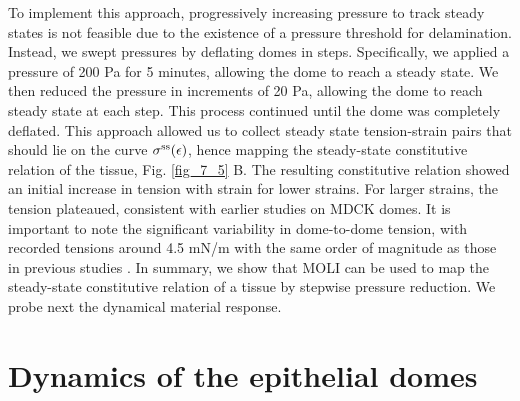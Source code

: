 To implement this approach, progressively increasing pressure to track steady states is not feasible due to the existence of a pressure threshold for delamination. Instead, we swept pressures by deflating domes in steps. Specifically, we applied a pressure of 200 \unit{\pascal} for 5 minutes, allowing the dome to reach a steady state. We then reduced the pressure in increments of 20 \unit{\pascal}, allowing the dome to reach steady state at each step. This process continued until the dome was completely deflated. This approach allowed us to collect steady state tension-strain pairs that should lie on the curve $\sigma^{\rm ss}(\epsilon)$, hence mapping the steady-state constitutive relation of the tissue, Fig. \ref{fig_7_5} B. The resulting constitutive relation showed an initial increase in tension with strain for lower strains. For larger strains, the tension plateaued, consistent with earlier studies on MDCK domes. It is important to note the significant variability in dome-to-dome tension, with recorded tensions around 4.5 \unit{mN/m} with the same order of magnitude as those in previous studies \cite{latorre2018,marin-llaurado2022}. In summary, we show that MOLI can be used to map the steady-state constitutive relation of a tissue by stepwise pressure reduction. We probe next the dynamical material response.

\hypertarget{dynamics-of-the-epithelia-domes}{\section{Dynamics of the epithelial domes}\label{dynamics-of-the-epithelial-domes}}

